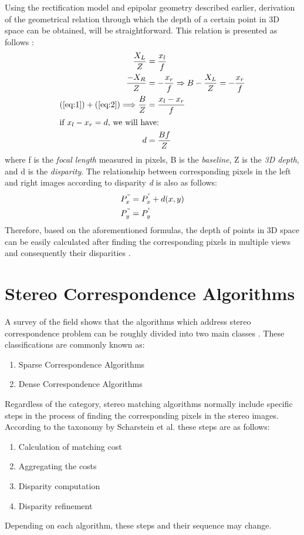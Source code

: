 Using the rectification model and epipolar geometry described earlier, 
derivation of the geometrical relation through which the depth of a certain point in 3D space 
can be obtained, will be straightforward. This relation is presented as follows \cite{sze11}:
\begin{align}
\frac{X_{L}}{Z} &= \frac{x_{l}}{f} \label{eq:1} \\
\frac{-X_{R}}{Z} &= -\frac{x_{r}}{f}  \Rightarrow B-\frac{X_{L}}{Z}=-\frac{x_{r}}{f} \label{eq:2} \\
(\ref{eq:1}) + (\ref{eq:2}) \Longrightarrow  \frac{B}{Z} &= \frac{x_{l}-x_{r}}{f} \label{eq:3} \\
\intertext{if $x_{l}-x_{r}=d$, we will have:}
d &= \frac{Bf}{Z} \label{eq:dispeq}
\end{align}
where f is the {\it focal length} measured in pixels, B is the {\it baseline}, Z is the {\it 3D depth}, and d is the {\it disparity}. The relationship between corresponding pixels in the left
and right images according to disparity {\it d} is also as follows:
\begin{align}
{P}^{"}_{x} &= {P}^{'}_{x}+d(x,y) \\
{P}^{"}_{y} &= {P}^{'}_{y}
\end{align}
Therefore, based on the aforementioned formulas, the depth of points in 3D space can be easily calculated after finding the corresponding pixels in multiple views and consequently their
disparities \cite{bol87,oku93,sch02}.

\section{Stereo Correspondence Algorithms}
A survey of the field shows that the algorithms which address stereo correspondence problem can be roughly divided into two main classes \cite{sch02}. These classifications are commonly known as:
\begin{enumerate}
\item Sparse Correspondence Algorithms
\item Dense Correspondence Algorithms 
\end{enumerate}

Regardless of the category, stereo matching algorithms normally include specific steps in the process of finding the corresponding pixels in the stereo images.
According to the taxonomy by Scharstein et al. these steps are as follows:

\begin{enumerate}
\item {Calculation of matching cost}
\item {Aggregating the costs}
\item {Disparity computation}
\item {Disparity refinement}
\end{enumerate}
Depending on each algorithm, these steps and their sequence may change.

